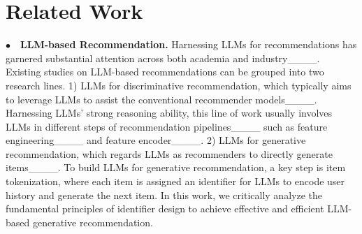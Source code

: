 \section{Related Work}
\label{sec:related_work}

\noindent$\bullet\quad$\textbf{LLM-based Recommendation.} Harnessing LLMs for recommendations has garnered substantial attention across both academia and industry____. 
Existing studies on LLM-based recommendations can be grouped into two research lines. 
1) LLMs for discriminative recommendation, which typically aims to leverage LLMs to assist the conventional recommender models____.                     
Harnessing LLMs' strong reasoning ability, this line of work usually involves LLMs in different steps of recommendation pipelines____ such as feature engineering____ and feature encoder____. 
2) LLMs for generative recommendation, which regards LLMs as recommenders to directly generate items____. 
To build LLMs for generative recommendation, a key step is item tokenization, where each item is assigned an identifier for LLMs to encode user history and generate the next item. 
In this work, we critically analyze the fundamental principles of identifier design to achieve effective and efficient LLM-based generative recommendation. 

